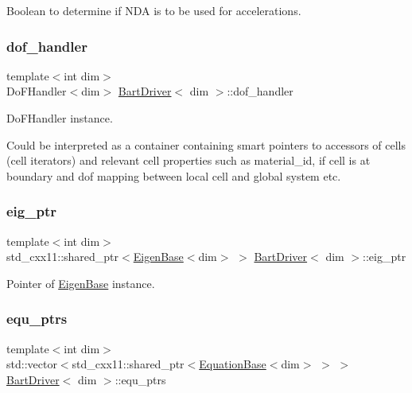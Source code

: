 Boolean to determine if N\+DA is to be used for accelerations. 

\mbox{\label{class_bart_driver_a102ccb2fc2ea225bc75f757214152c1b}} 
\subsubsection{\texorpdfstring{dof\+\_\+handler}{dof\_handler}}
{\footnotesize\ttfamily template$<$int dim$>$ \\
Do\+F\+Handler$<$dim$>$ \hyperlink{class_bart_driver}{Bart\+Driver}$<$ dim $>$\+::dof\+\_\+handler\hspace{0.3cm}{\ttfamily [private]}}



Do\+F\+Handler instance. 

Could be interpreted as a container containing smart pointers to accessors of cells (cell iterators) and relevant cell properties such as material\+\_\+id, if cell is at boundary and dof mapping between local cell and global system etc. \mbox{\label{class_bart_driver_a90adc0f013f07a10c5d423e3506bd589}} 
\subsubsection{\texorpdfstring{eig\+\_\+ptr}{eig\_ptr}}
{\footnotesize\ttfamily template$<$int dim$>$ \\
std\+\_\+cxx11\+::shared\+\_\+ptr$<$\hyperlink{class_eigen_base}{Eigen\+Base}$<$dim$>$ $>$ \hyperlink{class_bart_driver}{Bart\+Driver}$<$ dim $>$\+::eig\+\_\+ptr\hspace{0.3cm}{\ttfamily [private]}}



Pointer of \hyperlink{class_eigen_base}{Eigen\+Base} instance. 

\mbox{\label{class_bart_driver_a0a6f52aed8e9c22da12a99653d1acba8}} 
\subsubsection{\texorpdfstring{equ\+\_\+ptrs}{equ\_ptrs}}
{\footnotesize\ttfamily template$<$int dim$>$ \\
std\+::vector$<$std\+\_\+cxx11\+::shared\+\_\+ptr$<$\hyperlink{class_equation_base}{Equation\+Base}$<$dim$>$ $>$ $>$ \hyperlink{class_bart_driver}{Bart\+Driver}$<$ dim $>$\+::equ\+\_\+ptrs\hspace{0.3cm}{\ttfamily [private]}}



